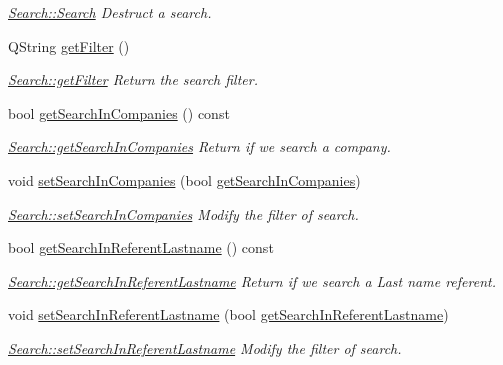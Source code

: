 \begin{DoxyCompactItemize}
\begin{DoxyCompactList}\small\item\em \hyperlink{classSearch_af629e7254d367d2b2cacfb0699c9de31}{Search\+::\+Search} Destruct a search. \end{DoxyCompactList}\item 
Q\+String \hyperlink{classSearch_ad4cbed03998957eb80a2d1b536407f01}{get\+Filter} ()
\begin{DoxyCompactList}\small\item\em \hyperlink{classSearch_ad4cbed03998957eb80a2d1b536407f01}{Search\+::get\+Filter} Return the search filter. \end{DoxyCompactList}\item 
bool \hyperlink{classSearch_a683100feb68358d1eedda781f700cd46}{get\+Search\+In\+Companies} () const 
\begin{DoxyCompactList}\small\item\em \hyperlink{classSearch_a683100feb68358d1eedda781f700cd46}{Search\+::get\+Search\+In\+Companies} Return if we search a company. \end{DoxyCompactList}\item 
void \hyperlink{classSearch_a1c2abc83b8995d5b1d908905a7212042}{set\+Search\+In\+Companies} (bool \hyperlink{classSearch_a683100feb68358d1eedda781f700cd46}{get\+Search\+In\+Companies})
\begin{DoxyCompactList}\small\item\em \hyperlink{classSearch_a1c2abc83b8995d5b1d908905a7212042}{Search\+::set\+Search\+In\+Companies} Modify the filter of search. \end{DoxyCompactList}\item 
bool \hyperlink{classSearch_afb76798798f03d34f8d2363d7062ec0f}{get\+Search\+In\+Referent\+Lastname} () const 
\begin{DoxyCompactList}\small\item\em \hyperlink{classSearch_afb76798798f03d34f8d2363d7062ec0f}{Search\+::get\+Search\+In\+Referent\+Lastname} Return if we search a Last name referent. \end{DoxyCompactList}\item 
void \hyperlink{classSearch_a18603321d8e2039b181dbfe082689a08}{set\+Search\+In\+Referent\+Lastname} (bool \hyperlink{classSearch_afb76798798f03d34f8d2363d7062ec0f}{get\+Search\+In\+Referent\+Lastname})
\begin{DoxyCompactList}\small\item\em \hyperlink{classSearch_a18603321d8e2039b181dbfe082689a08}{Search\+::set\+Search\+In\+Referent\+Lastname} Modify the filter of search. \end{DoxyCompactList}\item 

\end{DoxyCompactItemize}
